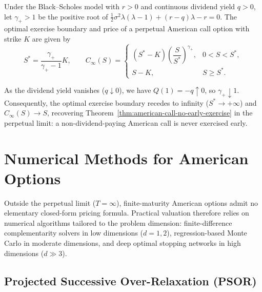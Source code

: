 \begin{theorem}\label{thm:perpetual-call}
    Under the Black--Scholes model with $r > 0$ and continuous dividend yield $q > 0$, let $\gamma_+ > 1$ be the positive root of $\frac{1}{2}\sigma^2 \lambda(\lambda - 1) + (r - q)\lambda - r = 0$. The optimal exercise boundary and price of a perpetual American call option with strike $K$ are given by
    \[
    S^* = \frac{\gamma_+}{\gamma_+ - 1} K, \qquad
    C_\infty(S) = \begin{cases}
        (S^* - K)\left(\dfrac{S}{S^*}\right)^{\gamma_+}, & 0 < S < S^*, \\[6pt]
        S - K, & S \ge S^*.
    \end{cases}
    \]
\end{theorem}

\begin{remark}
    As the dividend yield vanishes ($q \downarrow 0$), we have $Q(1) = -q \uparrow 0$, so $\gamma_+ \downarrow 1$. Consequently, the optimal exercise boundary recedes to infinity ($S^* \to +\infty$) and $C_\infty(S) \to S$, recovering Theorem~\ref{thm:american-call-no-early-exercise} in the perpetual limit: a non-dividend-paying American call is never exercised early.
\end{remark}

\section{Numerical Methods for American Options}

Outside the perpetual limit ($T = \infty$), finite-maturity American options admit no elementary closed-form pricing formula. Practical valuation therefore relies on numerical algorithms tailored to the problem dimension: finite-difference complementarity solvers in low dimensions ($d = 1, 2$), regression-based Monte Carlo in moderate dimensions, and deep optimal stopping networks in high dimensions ($d \gg 3$).

\subsection{Projected Successive Over-Relaxation (PSOR)}

